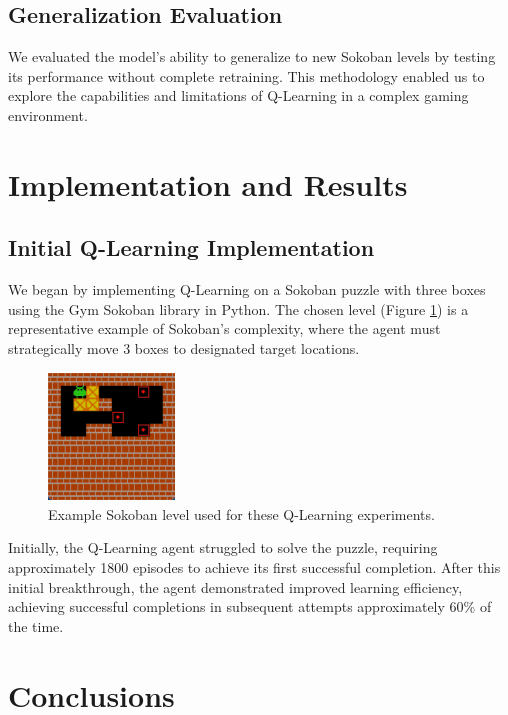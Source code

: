 \documentclass[10pt,twocolumn]{article}
\begin{document}
\subsection{Generalization Evaluation}

We evaluated the model's ability to generalize to new Sokoban levels by testing its performance without complete retraining. This methodology enabled us to explore the capabilities and limitations of Q-Learning in a complex gaming environment.

\section{Implementation and Results}

\subsection{Initial Q-Learning Implementation}

We began by implementing Q-Learning on a Sokoban puzzle with three boxes using the Gym Sokoban library in Python. The chosen level (Figure \ref{fig:sokoban_level}) is a representative example of Sokoban's complexity, where the agent must strategically move 3 boxes to designated target locations.

\begin{figure}[ht]
    \centering
    \includegraphics[width=0.3\textwidth]{Images/sokoban.png}
    \caption{Example Sokoban level used for these Q-Learning experiments.}
    \label{fig:sokoban_level}
\end{figure}

Initially, the Q-Learning agent struggled to solve the puzzle, requiring approximately 1800 episodes to achieve its first successful completion. After this initial breakthrough, the agent demonstrated improved learning efficiency, achieving successful completions in subsequent attempts approximately 60\% of the time.



\section{Conclusions}
\label{sec:conclusions}

\printbibliography
\end{document}
